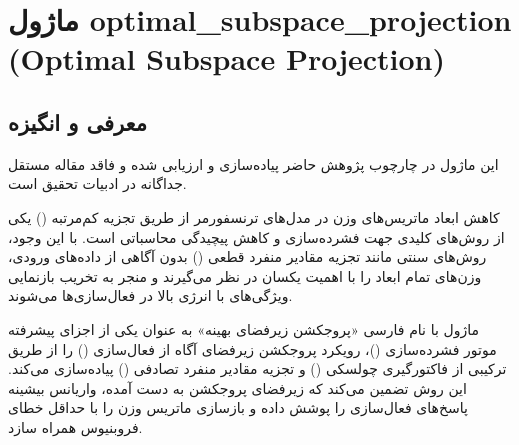 \section{ماژول optimal\_subspace\_projection (Optimal Subspace Projection)}
\label{sec:module_optimal_subspace_projection}

\subsection{معرفی و انگیزه}
این ماژول در چارچوب پژوهش حاضر پیاده‌سازی و ارزیابی شده و فاقد مقاله مستقل جداگانه در ادبیات تحقیق است.

کاهش ابعاد ماتریس‌های وزن در مدل‌های ترنسفورمر از طریق تجزیه کم‌مرتبه () یکی از روش‌های کلیدی جهت فشرده‌سازی و کاهش پیچیدگی محاسباتی است. با این وجود، روش‌های سنتی مانند تجزیه مقادیر منفرد قطعی () بدون آگاهی از داده‌های ورودی، وزن‌های تمام ابعاد را با اهمیت یکسان در نظر می‌گیرند و منجر به تخریب بازنمایی ویژگی‌های با انرژی بالا در فعال‌سازی‌ها می‌شوند.

ماژول  با نام فارسی «پروجکشن زیرفضای بهینه» به عنوان یکی از اجزای پیشرفته موتور فشرده‌سازی ()، رویکرد پروجکشن زیرفضای آگاه از فعال‌سازی () را از طریق ترکیبی از فاکتورگیری چولسکی () و تجزیه مقادیر منفرد تصادفی () پیاده‌سازی می‌کند. این روش تضمین می‌کند که زیرفضای پروجکشن به دست آمده، واریانس بیشینه پاسخ‌های فعال‌سازی را پوشش داده و بازسازی ماتریس وزن را با حداقل خطای فروبنیوس همراه سازد.

